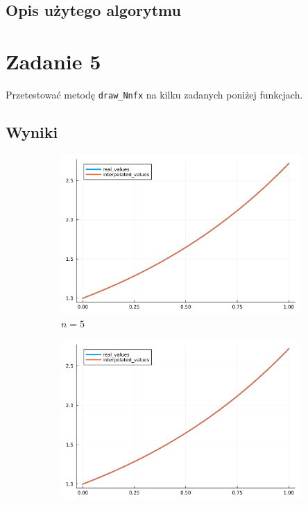\documentclass{article}
\def\v{0.47}
\begin{document}
\subsection*{Opis użytego algorytmu}

\section*{Zadanie 5}
	Przetestować metodę \texttt{draw\_Nnfx} na kilku zadanych poniżej funkcjach.
\subsection*{Wyniki}
	\begin{figure}[H]
	    \centering
		\begin{subfigure}[b]{\v\linewidth}
			\includegraphics[width=\linewidth]{graphs/zad5.a.5.png}
			\caption{$n = 5$}
		\end{subfigure}
		\begin{subfigure}[b]{\v\linewidth}
			\includegraphics[width=\linewidth]{graphs/zad5.a.10.png}

\end{subfigure}
\end{figure}
\end{document}
